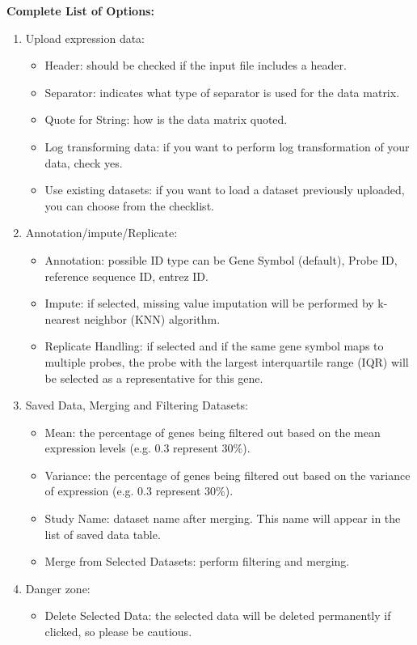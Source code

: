 \textbf{Complete List of Options:} 
\begin{enumerate}
\item Upload expression data:
\begin{itemize}
\item Header: should be checked if the input file includes a header.
\item Separator: indicates what type of separator is used for the data matrix.
\item Quote for String: how is the data matrix quoted.
\item Log transforming data: if you want to perform log transformation of your data, check yes.
\item Use existing datasets: if you want to load a dataset previously uploaded, you can choose from the checklist.
\end{itemize}
\item Annotation/impute/Replicate:
\begin{itemize}
\item Annotation: possible ID type can be Gene Symbol (default), Probe ID, reference sequence ID, entrez ID.
\item Impute: if selected, missing value imputation will be performed by k-nearest neighbor (KNN) algorithm.
\item Replicate Handling: if selected and if the same gene symbol maps to multiple probes, the probe with the largest interquartile range (IQR) will be selected
as a representative for this gene.
\end{itemize}
\item Saved Data, Merging and Filtering Datasets:
\begin{itemize}
\item Mean: the percentage of genes being filtered out based on the mean expression levels (e.g. 0.3 represent 30\%).
\item Variance: the percentage of genes being filtered out based on the variance of expression (e.g. 0.3 represent 30\%).
\item Study Name: dataset name after merging. This name will appear in the list of saved data table.
\item Merge from Selected Datasets: perform filtering and merging.
\end{itemize}
\item Danger zone:
\begin{itemize}
\item Delete Selected Data: the selected data will be deleted permanently if clicked, so please be cautious.
\end{itemize}

\end{enumerate}




